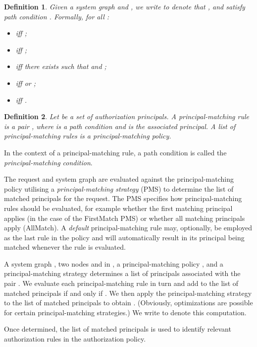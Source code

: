 \documentclass{article}
\newtheorem{definition}{Definition}
\begin{document}
\begin{definition}\label{def:path-condition-semantics}
    Given a system graph  and , we write  to denote that  ,  and  \emph{satisfy path condition} .
    Formally, for all :
    \begin{itemize}
        \item  iff ;
        \item  iff ;
        \item  iff there exists  such that  and ;
        \item  iff  or ;
        \item  iff .
    \end{itemize}
\end{definition}

\begin{definition}
    Let  be a set of authorization principals.
    A \emph{principal-matching rule} is a pair , where  is a path condition and  is the associated principal.
    A list of principal-matching rules is a \emph{principal-matching policy}.
\end{definition}

In the context of a principal-matching rule, a path condition is called the \emph{principal-matching condition}.

The request and system graph are evaluated against the principal-matching policy utilising a \emph{principal-matching strategy} (PMS) to determine the list of matched principals for the request.
The PMS specifies how principal-matching rules should be evaluated, for example whether the first matching principal applies (in the case of the \textsf{FirstMatch} PMS) or whether all matching principals apply (\textsf{AllMatch}).
A \emph{default} principal-matching rule  may, optionally, be employed as the last rule in the policy and will automatically result in its principal  being matched whenever the rule is evaluated.

A system graph , two nodes  and  in , a principal-matching policy , and a principal-matching strategy  determines a list of principals  associated with the pair .
We evaluate each principal-matching rule  in turn and add  to the list of matched principals if and only if .
We then apply the principal-matching strategy to the list of matched principals to obtain .
(Obviously, optimizations are possible for certain principal-matching strategies.)
We write  to denote this computation.

Once determined, the list of matched principals is used to identify relevant authorization rules in the authorization policy.
\end{document}

